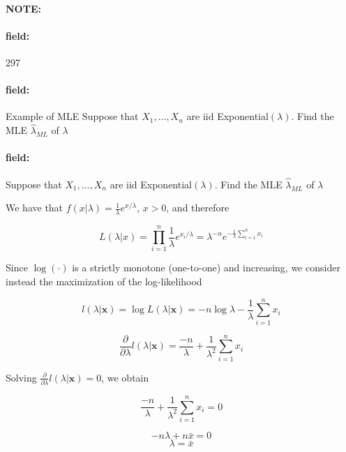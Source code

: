 \documentclass[12pt]{article}
\newenvironment{note}{\paragraph{NOTE:}}{}
\newenvironment{field}{\paragraph{field:}}{}
\begin{document}
\begin{note} \begin{field} \tiny 297 \end{field}
  \begin{field}
    Example of MLE
    Suppose that $X_1, \ldots , X_n$ are iid Exponential$(\lambda)$. Find the MLE $\hat{\lambda}_{ML}$ of $\lambda$
  \end{field}
  \begin{field}
    Suppose that $X_1, \ldots , X_n$ are iid Exponential$(\lambda)$. Find the MLE $\hat{\lambda}_{ML}$ of $\lambda$

    We have that $f(x|\lambda) = \frac{1}{\lambda}e^{x/\lambda}$, $x>0$, and therefore

    $$L(\lambda|x) = \prod _{i = 1}^n \frac{1}{\lambda}e^{x_i/\lambda} = \lambda^{-n}e^{-\frac{1}{\lambda}\sum _{i = 1}^n x_i}$$


    Since $\log(\cdot)$ is a strictly monotone (one-to-one) and increasing, we consider instead the maximization of the log-likelihood

    $$l(\lambda|\mathbf{x}) = \log L(\lambda|\mathbf{x}) = -n\log \lambda - \frac{1}{\lambda} \sum _{i = 1}^n x_i$$

    $$\frac{\partial  }{\partial \lambda } l(\lambda | \mathbf{x}) = \frac{-n}{\lambda} + \frac{1}{\lambda^2}\sum _{i = 1}^n x_i$$

    Solving $\frac{\partial  }{\partial \lambda } l(\lambda|\mathbf{x})= 0$, we obtain

    $$ \frac{-n}{\lambda} + \frac{1}{\lambda^2}\sum _{i = 1}^n x_i = 0$$

    $$ -n\lambda + n \bar{x} = 0$$
    $$\lambda = \bar{x}$$

  \end{field}
\end{note}
\end{document}
